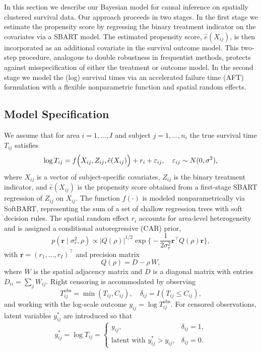\documentclass[useAMS,referee]{biom}
\begin{document}
In this section we describe our Bayesian model for causal inference on spatially clustered survival data. Our approach proceeds in two stages. In the first stage we estimate the propensity score by regressing the binary treatment indicator on the covariates via a SBART model. The estimated propensity score, $\hat{e}(X_{ij})$, is then incorporated as an additional covariate in the survival outcome model. This two‐step procedure, analogous to double robustness in frequentist methods, protects against misspecification of either the treatment or outcome model. In the second stage we model the (log) survival times via an accelerated failure time (AFT) formulation with a flexible nonparametric function and spatial random effects.

\subsection{Model Specification}

We assume that for area $i=1,\ldots,I$ and subject $j=1,\ldots,n_i$ the true survival time $T_{ij}$ satisfies
\begin{equation} \label{eq:aftmodel}
\log T_{ij} = f\Bigl(X_{ij}, Z_{ij}, \hat{e}(X_{ij})\Bigr) + r_i + \varepsilon_{ij}, \quad \varepsilon_{ij}\sim N(0,\sigma^2),
\end{equation}
where $X_{ij}$ is a vector of subject-specific covariates, $Z_{ij}$ is the binary treatment indicator, and $\hat{e}(X_{ij})$ is the propensity score obtained from a first-stage SBART regression of $Z_{ij}$ on $X_{ij}$. The function $f(\cdot)$ is modeled nonparametrically via SoftBART, representing the sum of a set of shallow regression trees with soft decision rules. The spatial random effect $r_i$ accounts for area-level heterogeneity and is assigned a conditional autoregressive (CAR) prior,
\begin{equation} \label{eq:carprior}
p(\bm{r}\mid\sigma_r^2,\rho) \propto \vert Q(\rho)\vert^{1/2} \exp\Biggl\{-\frac{1}{2\sigma_r^2}\bm{r}^\top Q(\rho)\bm{r}\Biggr\},
\end{equation}
with $\bm{r}=(r_1,\ldots,r_I)^\top$ and precision matrix
\[
Q(\rho)=D-\rho\,W,
\]
where $W$ is the spatial adjacency matrix and $D$ is a diagonal matrix with entries $D_{ii}=\sum_jW_{ij}$. Right censoring is accommodated by observing
\[
T_{ij}^{\mathrm{obs}} = \min(T_{ij}, C_{ij}), \quad \delta_{ij}=I(T_{ij}\le C_{ij}),
\]
and working with the log-scale outcome $y_{ij}=\log T_{ij}^{\mathrm{obs}}$. For censored observations, latent variables $y_{ij}^\ast$ are introduced so that
\[
y_{ij}^\ast = \log T_{ij} = 
\begin{cases}
y_{ij}, & \delta_{ij}=1,\\[1mm]
\text{latent with } y_{ij}^\ast > y_{ij}, & \delta_{ij}=0.
\end{cases}
\]
\end{document}
